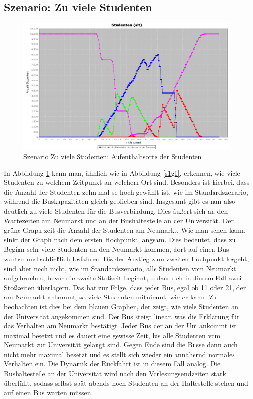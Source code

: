 \documentclass[12pt,a4paper]{scrartcl}
\begin{document}
\subsection{Szenario: Zu viele Studenten}\label{s2}

\begin{figure}
\includegraphics[scale=0.4]{Viele_Studenten_Aufenthaltsorte.png}
\caption{Szenario \glqq Zu viele Studenten\grqq : Aufenthaltsorte der Studenten}
\label{s2g1}
\end{figure}

In Abbildung \ref{s2g1} kann man, ähnlich wie in Abbildung \ref{s1g1}, erkennen, wie viele Studenten zu welchem Zeitpunkt an welchem Ort sind. Besonders ist hierbei, dass die Anzahl der Studenten zehn mal so hoch gewählt ist, wie im Standardszenario, während die Buskapazitäten gleich geblieben sind. Insgesamt gibt es nun also deutlich zu viele Studenten für die Busverbindung. Dies äußert sich an den Wartezeiten am Neumarkt und an der Bushaltestelle an der Universität.
Der grüne Graph zeit die Anzahl der Studenten am Neumarkt. Wie man sehen kann, sinkt der Graph  nach dem ersten Hochpunkt langsam. Dies bedeutet, dass zu Beginn sehr viele Studenten an den Neumarkt kommen, dort auf einen Bus warten und schließlich losfahren. Bis der Anstieg zum zweiten Hochpunkt losgeht, sind aber noch nicht, wie im Standardszenario, alle Studenten vom Neumarkt aufgebrochen, bevor die zweite Stoßzeit beginnt, sodass sich in diesem Fall zwei Stoßzeiten überlagern. Das hat zur Folge, dass jeder Bus, egal ob 11 oder 21, der am Neumarkt ankommt, so viele Studenten mitnimmt, wie er kann. Zu beobachten ist dies bei dem blauen Graphen, der zeigt, wie viele Studenten an der Universität angekommen sind. Der Bus steigt linear, was die Erklärung für das Verhalten am Neumarkt bestätigt. Jeder Bus der an der Uni ankommt ist maximal besetzt und es dauert eine gewisse Zeit, bis alle Studenten vom Neumarkt zur Universität gelangt sind. Gegen Ende sind die Busse dann auch nicht mehr maximal besetzt und es stellt sich wieder ein annähernd normales Verhalten ein. 
Die Dynamik der Rückfahrt ist in diesem Fall analog. Die Bushaltestelle an der Universität wird nach den Vorlesungsendzeiten stark überfüllt, sodass selbst spät abends noch Studenten an der Haltestelle stehen und auf einen Bus warten müssen. 
\end{document}
